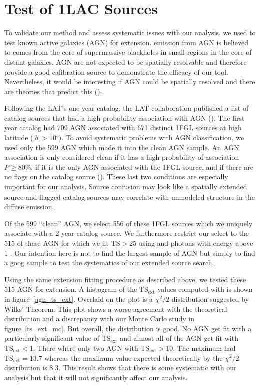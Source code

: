 \documentclass[12pt,preprint]{aastex}
\newcommand{\gev}{\text{GeV}\xspace}
\newcommand{\tsext}{{\ensuremath{\text{TS}_\text{ext}}}\xspace}
\newcommand{\ts}{\text{TS}\xspace}
\renewcommand{\deg}{\ensuremath{^\circ}\xspace}
\newcommand{\pointlike}{\text{\em pointlike}\xspace}
\begin{document}
\section{Test of 1LAC Sources}
\label{test_1lac_sources}

To validate our method and assess systematic issues with our analysis,
we used \pointlike to test known active galaxies (AGN) for extension.
\gev emission from AGN is believed to comes from the core of supermassive
blackholes in small regions in the core of distant galaxies.  AGN are
not expected to be spatially resolvable and therefore provide a good
calibration source to demonstrate the efficacy of our tool. Nevertheless,
it would be interesting if AGN could be spatially resolved and
there are theories that predict this (\cite{pair_halo_paper}).

Following the LAT's one year catalog, the LAT collaboration published
a list of catalog sources that had a high probability association with
AGN (\cite{first_agn_cat}).
The first year catalog had 709 AGN associated with 671 distinct
1FGL sources at high latitude ($|b|>10\deg$).  To avoid systematic
problems with AGN classification, we used only the 599 AGN which made
it into the clean AGN sample.  An AGN association is only considered
clean if it has a high probability of association $P\ge 80\%$, if it is
the only AGN associated with the 1FGL source, and if there are no flags
on the catalog source (\cite{first_cat}). These last two conditions are
especially important for our analysis.  Source confusion may look like
a spatially extended source and flagged catalog sources may correlate
with unmodeled structure in the diffuse emission.

Of the 599 ``clean'' AGN, we select 556 of these 1FGL sources which
we uniquely associate with a 2 year catalog source. We furthermore
restrict our select to the 515 of these AGN for which we fit $\ts>25$
using \pointlike and photons with energy above 1 \gev.  Our intention
here is not to find the largest sample of AGN but simply
to find a goog sample to test the systematics of our extended source
search.

Using the same extension fitting procedure as described above, we tested
these 515 AGN for extension. A histogram of the \tsext values computed
with \pointlike is shown in figure~\ref{agn_ts_ext}. Overlaid on the plot
is a $\chi^2/2$ distribution suggested by Wilks' Theorem.  This plot
shows a worse agreement with the theoretical distribution and
a discrepancy with 
our Monte Carlo study in figure~\ref{ts_ext_mc}.  But overall, the
distribution is good. No AGN get fit with a particularly significant
value of $\tsext$ and almost all of the AGN get fit with $\tsext<1$.
There where only two AGN with $\tsext>10$. The maximum had $\tsext=13.7$
whereas the maximum value expected theoretically by the $\chi^2/2$ distribution is
8.3. This result shows that there is some systematic with our
analysis but that it will not significantly affect our analysis.
\end{document}
